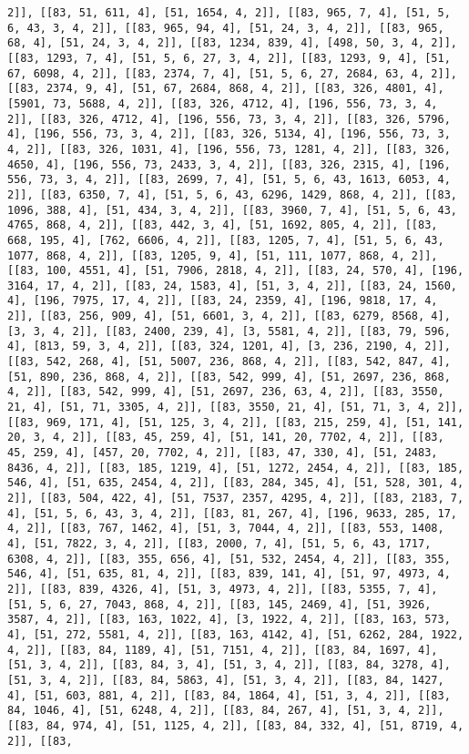 \documentclass[12pt,fleqn]{article}\usepackage{../../common}
\begin{document}
\begin{verbatim}
2]], [[83, 51, 611, 4], [51, 1654, 4, 2]], [[83, 965, 7, 4], [51, 5, 6, 43, 3, 4, 2]], [[83, 965, 94, 4], [51, 24, 3, 4, 2]], [[83, 965, 68, 4], [51, 24, 3, 4, 2]], [[83, 1234, 839, 4], [498, 50, 3, 4, 2]], [[83, 1293, 7, 4], [51, 5, 6, 27, 3, 4, 2]], [[83, 1293, 9, 4], [51, 67, 6098, 4, 2]], [[83, 2374, 7, 4], [51, 5, 6, 27, 2684, 63, 4, 2]], [[83, 2374, 9, 4], [51, 67, 2684, 868, 4, 2]], [[83, 326, 4801, 4], [5901, 73, 5688, 4, 2]], [[83, 326, 4712, 4], [196, 556, 73, 3, 4, 2]], [[83, 326, 4712, 4], [196, 556, 73, 3, 4, 2]], [[83, 326, 5796, 4], [196, 556, 73, 3, 4, 2]], [[83, 326, 5134, 4], [196, 556, 73, 3, 4, 2]], [[83, 326, 1031, 4], [196, 556, 73, 1281, 4, 2]], [[83, 326, 4650, 4], [196, 556, 73, 2433, 3, 4, 2]], [[83, 326, 2315, 4], [196, 556, 73, 3, 4, 2]], [[83, 2699, 7, 4], [51, 5, 6, 43, 1613, 6053, 4, 2]], [[83, 6350, 7, 4], [51, 5, 6, 43, 6296, 1429, 868, 4, 2]], [[83, 1096, 388, 4], [51, 434, 3, 4, 2]], [[83, 3960, 7, 4], [51, 5, 6, 43, 4765, 868, 4, 2]], [[83, 442, 3, 4], [51, 1692, 805, 4, 2]], [[83, 668, 195, 4], [762, 6606, 4, 2]], [[83, 1205, 7, 4], [51, 5, 6, 43, 1077, 868, 4, 2]], [[83, 1205, 9, 4], [51, 111, 1077, 868, 4, 2]], [[83, 100, 4551, 4], [51, 7906, 2818, 4, 2]], [[83, 24, 570, 4], [196, 3164, 17, 4, 2]], [[83, 24, 1583, 4], [51, 3, 4, 2]], [[83, 24, 1560, 4], [196, 7975, 17, 4, 2]], [[83, 24, 2359, 4], [196, 9818, 17, 4, 2]], [[83, 256, 909, 4], [51, 6601, 3, 4, 2]], [[83, 6279, 8568, 4], [3, 3, 4, 2]], [[83, 2400, 239, 4], [3, 5581, 4, 2]], [[83, 79, 596, 4], [813, 59, 3, 4, 2]], [[83, 324, 1201, 4], [3, 236, 2190, 4, 2]], [[83, 542, 268, 4], [51, 5007, 236, 868, 4, 2]], [[83, 542, 847, 4], [51, 890, 236, 868, 4, 2]], [[83, 542, 999, 4], [51, 2697, 236, 868, 4, 2]], [[83, 542, 999, 4], [51, 2697, 236, 63, 4, 2]], [[83, 3550, 21, 4], [51, 71, 3305, 4, 2]], [[83, 3550, 21, 4], [51, 71, 3, 4, 2]], [[83, 969, 171, 4], [51, 125, 3, 4, 2]], [[83, 215, 259, 4], [51, 141, 20, 3, 4, 2]], [[83, 45, 259, 4], [51, 141, 20, 7702, 4, 2]], [[83, 45, 259, 4], [457, 20, 7702, 4, 2]], [[83, 47, 330, 4], [51, 2483, 8436, 4, 2]], [[83, 185, 1219, 4], [51, 1272, 2454, 4, 2]], [[83, 185, 546, 4], [51, 635, 2454, 4, 2]], [[83, 284, 345, 4], [51, 528, 301, 4, 2]], [[83, 504, 422, 4], [51, 7537, 2357, 4295, 4, 2]], [[83, 2183, 7, 4], [51, 5, 6, 43, 3, 4, 2]], [[83, 81, 267, 4], [196, 9633, 285, 17, 4, 2]], [[83, 767, 1462, 4], [51, 3, 7044, 4, 2]], [[83, 553, 1408, 4], [51, 7822, 3, 4, 2]], [[83, 2000, 7, 4], [51, 5, 6, 43, 1717, 6308, 4, 2]], [[83, 355, 656, 4], [51, 532, 2454, 4, 2]], [[83, 355, 546, 4], [51, 635, 81, 4, 2]], [[83, 839, 141, 4], [51, 97, 4973, 4, 2]], [[83, 839, 4326, 4], [51, 3, 4973, 4, 2]], [[83, 5355, 7, 4], [51, 5, 6, 27, 7043, 868, 4, 2]], [[83, 145, 2469, 4], [51, 3926, 3587, 4, 2]], [[83, 163, 1022, 4], [3, 1922, 4, 2]], [[83, 163, 573, 4], [51, 272, 5581, 4, 2]], [[83, 163, 4142, 4], [51, 6262, 284, 1922, 4, 2]], [[83, 84, 1189, 4], [51, 7151, 4, 2]], [[83, 84, 1697, 4], [51, 3, 4, 2]], [[83, 84, 3, 4], [51, 3, 4, 2]], [[83, 84, 3278, 4], [51, 3, 4, 2]], [[83, 84, 5863, 4], [51, 3, 4, 2]], [[83, 84, 1427, 4], [51, 603, 881, 4, 2]], [[83, 84, 1864, 4], [51, 3, 4, 2]], [[83, 84, 1046, 4], [51, 6248, 4, 2]], [[83, 84, 267, 4], [51, 3, 4, 2]], [[83, 84, 974, 4], [51, 1125, 4, 2]], [[83, 84, 332, 4], [51, 8719, 4, 2]], [[83, 
\end{verbatim}
\end{document}
